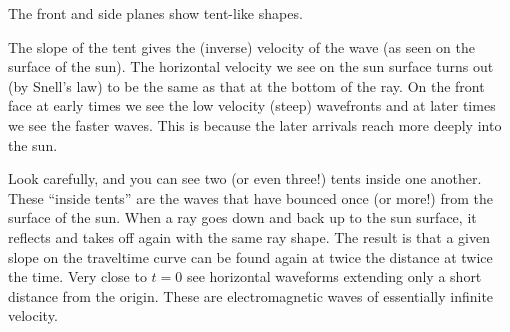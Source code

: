 The front and side planes show tent-like shapes.
\par
The slope of the tent gives the (inverse) velocity of the wave
(as seen on the surface of the sun).
The horizontal velocity we see on the sun surface turns out
(by Snell's law)
to be the same as that at the bottom of the ray.
On the front face at early times we see the low velocity (steep) wavefronts
and at later times we see the faster waves.
This is because the later arrivals reach more deeply into the sun.
\par
Look carefully, and you can see two (or even three!) tents inside one another.
These ``inside tents'' are the waves that have bounced once (or more!)
from the surface of the sun.
When a ray goes down and back up to the sun surface,
it reflects and takes off again with the same ray shape.
The result is that a given slope on the traveltime curve
can be found again at twice the distance at twice the time.
Very close to $t=0$ see horizontal waveforms
extending only a short distance from the origin.
These are electromagnetic waves of essentially infinite velocity.




